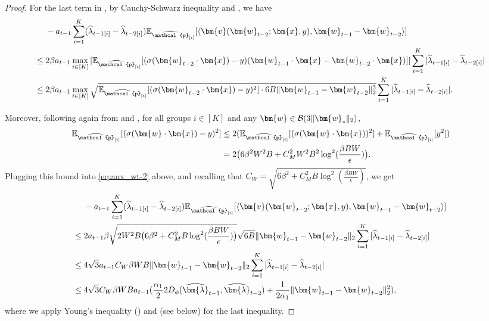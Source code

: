\documentclass[11pt]{article}
\numberwithin{thm}{section}
\theoremstyle{plain}
\theoremstyle{definition}
\theoremstyle{remark} \newtheorem{remark}[thm]{Remark}
\def\eps{{\epsilon}}
\def\vlambda{{\bm{\lambda}}}
\def\vv{{\bm{v}}}
\def\vw{{\bm{w}}}
\def\vx{{\bm{x}}}
\def\ep{\widehat{\mathcal{p}}}
\def\cB{{\mathcal{B}}}
\newcommand{\E}{\mathbb{E}}
\newcommand{\innp}[1]{\langle #1 \rangle}
\DeclarePairedDelimiter\norm{\|}{\|}
\newcommand{\epi}{\ep_{[i]}}
\newcommand{\elambda}{\widehat{\lambda}}
\newcommand{\evlambda}{\widehat{\vlambda}}
\begin{document}
\begin{proof}
    For the last term in , by Cauchy-Schwarz inequality and , we have 
	  \begin{align}\label{eq:aux_wt-2}
		&-a_{t-1}\sum_{i=1}^K(\elambda_{t-1[i]}-{\elambda}_{t-2[i]})\E_{\epi}[\innp{\vv(\vw_{t-2};\vx,y), \vw_{t-1}-\vw_{t-2}}]\notag \\
        \leq\;& 2\beta a_{t-1}\max_{i\in[K]}|\E_{\epi}[(\sigma(\vw_{t-2}\cdot \vx)-y)(\vw_{t-1}\cdot \vx-\vw_{t-2}\cdot \vx)]|\sum_{i=1}^K|\elambda_{t-1[i]}-{\elambda}_{t-2[i]}| \notag \\
		\leq\;& 2\beta a_{t-1} \max_{i\in[K]}\sqrt{\E_{\epi}[(\sigma(\vw_{t-2}\cdot \vx)-y)^2]\cdot 6B\|\vw_{t-1}-\vw_{t-2}\|_2^2}\sum_{i=1}^K|\elambda_{t-1[i]}-{\elambda}_{t-2[i]}|.
	\end{align}

	Moreover, following again from  and , for all groups \(i\in[K]\) and any \(\vw\in\cB(3\norm{\vw_*}_2)\),
	\begin{align*}
		\E_{\epi}[(\sigma(\vw\cdot \vx)-y)^2] \le\;& 2(\E_{\epi}[(\sigma(\vw\cdot \vx))^2]+ \E_{\epi}[y^2])\notag \\
		=\;& 2\big(6\beta^2W^2B+C_M^2W^2B^2\log^2(\frac{\beta BW}{\eps})\big) \notag.
	\end{align*}
    Plugging this bound into \eqref{eq:aux_wt-2} above, and recalling that  \(C_W=\sqrt{6\beta^2+C_M^2B\log^2(\frac{\beta BW}{\eps})}\), we get
    \begin{align}\label{eq:St-term2-bound2}
		&-a_{t-1}\sum_{i=1}^K(\elambda_{t-1[i]}-{\elambda}_{t-2[i]})\E_{\epi}[\innp{\vv(\vw_{t-2};\vx,y), \vw_{t-1}-\vw_{t-2}}] \notag \\
        \leq\;& 2a_{t-1}\beta\sqrt{2W^2B 
        \big(6\beta^2+C_M^2B\log^2(\frac{\beta BW}{\eps})\big)}\sqrt{6B}\|\vw_{t-1}-\vw_{t-2}\|_2\sum_{i=1}^K|\elambda_{t-1[i]}-\elambda_{t-2[i]}| \notag \\
        \leq\;& 4\sqrt{3}a_{t-1}C_W\beta WB\|\vw_{t-1}-\vw_{t-2}\|_2\sum_{i=1}^K|\elambda_{t-1[i]}-\elambda_{t-2[i]}|\notag \\
        \leq\;&4\sqrt{3}C_W\beta WB a_{t-1}(\frac{\alpha_1}{2}2D_{\phi}(\evlambda_{t-1},\evlambda_{t-2})+\frac{1}{2\alpha_1}\|\vw_{t-1}-\vw_{t-2}\|_2^2),
	\end{align}
    where we apply Young's inequality () and  (see below) for the last inequality.
    

\end{proof}
\end{document}
